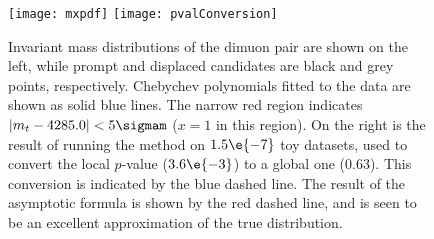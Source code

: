 \begin{figure}
  \begin{center}
    \texttt{[image: mxpdf]}
    \texttt{[image: pvalConversion]}
    \caption[dimuon mass distribution and $p$-value calculation]
    {
      Invariant mass distributions of the dimuon pair are shown on the left, while
      prompt and displaced candidates are black and grey points, respectively.
      Chebychev polynomials fitted to the data are shown as solid blue lines.
      The narrow red region indicates $|m_{t}-4285.0|<5\sigmam$ ($x=1$ in this region).
      On the right is the result of running the method on $1.5\e{-7}$ toy datasets, used to convert
      the local $p$-value ($3.6\e{-3}$) to a global one (0.63). This conversion is indicated by the
      blue dashed line.
      The result of the asymptotic formula is shown by the red dashed line, and is seen to be an
      excellent approximation of the true distribution.
    }
    \label{fig:db:mumu}
  \end{center}
\end{figure}






